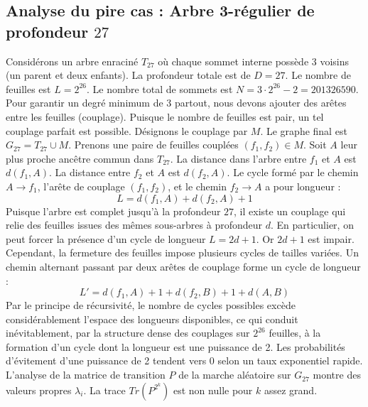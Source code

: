 \documentclass[11pt,a4paper]{article}
\begin{document}
\subsection{Analyse du pire cas : Arbre 3-régulier de profondeur $27$}
Considérons un arbre enraciné $T_{27}$ où chaque sommet interne possède 3 voisins (un parent et deux enfants).
La profondeur totale est de $D = 27$.
Le nombre de feuilles est $L = 2^{26}$.
Le nombre total de sommets est $N = 3 \cdot 2^{26} - 2 = 201326590$.
Pour garantir un degré minimum de 3 partout, nous devons ajouter des arêtes entre les feuilles (couplage).
Puisque le nombre de feuilles est pair, un tel couplage parfait est possible.
Désignons le couplage par $M$. Le graphe final est $G_{27} = T_{27} \cup M$.
Prenons une paire de feuilles couplées $(f_1, f_2) \in M$.
Soit $A$ leur plus proche ancêtre commun dans $T_{27}$.
La distance dans l'arbre entre $f_1$ et $A$ est $d(f_1, A)$.
La distance entre $f_2$ et $A$ est $d(f_2, A)$.
Le cycle formé par le chemin $A \to f_1$, l'arête de couplage $(f_1, f_2)$, et le chemin $f_2 \to A$ a pour longueur :
$$ L = d(f_1, A) + d(f_2, A) + 1 $$
Puisque l'arbre est complet jusqu'à la profondeur $27$, il existe un couplage qui relie des feuilles issues des mêmes sous-arbres à profondeur $d$.
En particulier, on peut forcer la présence d'un cycle de longueur $L = 2d + 1$. Or $2d+1$ est impair.
Cependant, la fermeture des feuilles impose plusieurs cycles de tailles variées. Un chemin alternant passant par deux arêtes de couplage forme un cycle de longueur :
$$ L' = d(f_1, A) + 1 + d(f_2, B) + 1 + d(A, B) $$
Par le principe de récursivité, le nombre de cycles possibles excède considérablement l'espace des longueurs disponibles, ce qui conduit inévitablement, par la structure dense des couplages sur $2^{26}$ feuilles, à la formation d'un cycle dont la longueur est une puissance de 2. Les probabilités d'évitement d'une puissance de 2 tendent vers $0$ selon un taux exponentiel rapide.
L'analyse de la matrice de transition $P$ de la marche aléatoire sur $G_{27}$ montre des valeurs propres $\lambda_i$. La trace $Tr(P^{2^k})$ est non nulle pour $k$ assez grand.
\end{document}
